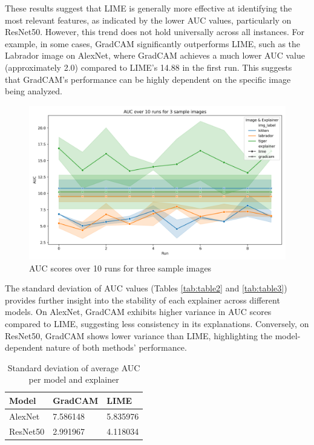 \documentclass{article}
\begin{document}
These results suggest that LIME is generally more effective at identifying the most relevant features, as indicated by the lower AUC values, particularly on ResNet50. However, this trend does not hold universally across all instances. For example, in some cases, GradCAM significantly outperforms LIME, such as the Labrador image on AlexNet, where GradCAM achieves a much lower AUC value (approximately 2.0) compared to LIME’s 14.88 in the first run. This suggests that GradCAM’s performance can be highly dependent on the specific image being analyzed.

\begin{figure}
    \centering
    \includegraphics[width=.8\linewidth]{results/auc-over10-runs-lineplot.png}
    \caption{AUC scores over 10 runs for three sample images}
    \label{fig:auc-over10-runs-lineplot}
\end{figure}

The standard deviation of AUC values (Tables \ref{tab:table2} and \ref{tab:table3}) provides further insight into the stability of each explainer across different models. On AlexNet, GradCAM exhibits higher variance in AUC scores compared to LIME, suggesting less consistency in its explanations. Conversely, on ResNet50, GradCAM shows lower variance than LIME, highlighting the model-dependent nature of both methods’ performance.

\begin{table}
    \centering
    \begin{tabular}{lll}
        \hline
        Model       & GradCAM      & LIME \\
        \hline
        AlexNet     & 7.586148    & 5.835976 \\
        ResNet50    & 2.991967    & 4.118034 \\
        \hline
    \end{tabular}
    \caption{Standard deviation of average AUC per model and explainer}
    \label{tab:table1}
\end{table}
\end{document}
